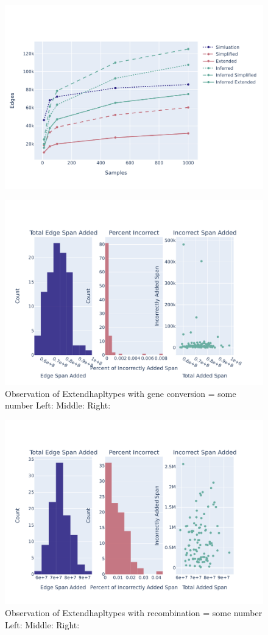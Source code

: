 \documentclass[10pt,twoside,lineno]{gsajnl}
\begin{document}
\begin{figure}
	\includegraphics[width=0.9\linewidth]{newplots_wo_ee/edge_counts_5e7.pdf}
\end{figure}

\begin{figure}
	\includegraphics[width=0.9\linewidth]{newplots_wo_ee/sampling_dist_geneconversion.pdf}
	\caption{Observation of Extendhapltypes with gene conversion = some number
	Left: 
	Middle:
	Right: }
\end{figure}

\begin{figure}
	\includegraphics[width=0.9\linewidth]{newplots_wo_ee/sampling_dist_recomb.pdf}
	\caption{Observation of Extendhapltypes with recombination = some number
		Left: 
		Middle:
		Right: }
\end{figure}
\end{document}
